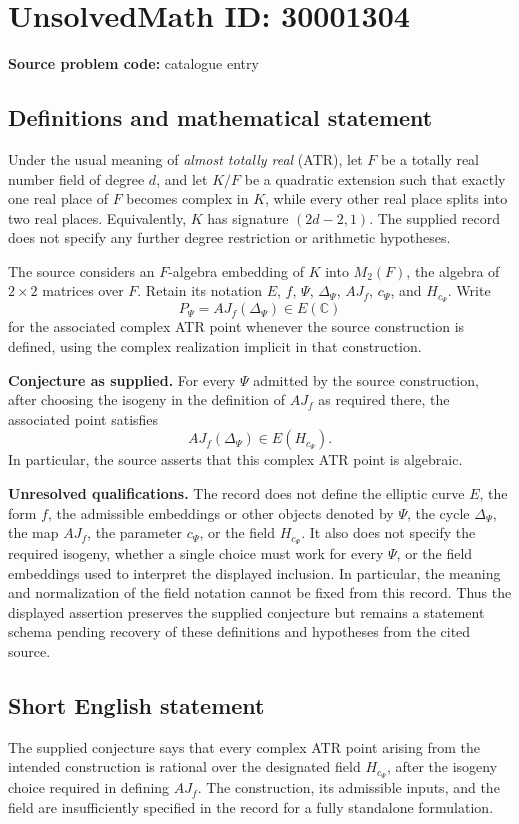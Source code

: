\documentclass[11pt]{article}
\newcommand{\C}{\mathbb{C}}
\begin{document}
\section*{UnsolvedMath ID: 30001304}
\textbf{Source problem code:} catalogue entry
\subsection{Definitions and mathematical statement}
Under the usual meaning of \emph{almost totally real} (ATR), let \(F\) be a totally real number field of degree \(d\), and let \(K/F\) be a quadratic extension such that exactly one real place of \(F\) becomes complex in \(K\), while every other real place splits into two real places. Equivalently, \(K\) has signature \((2d-2,1)\). The supplied record does not specify any further degree restriction or arithmetic hypotheses.

The source considers an \(F\)-algebra embedding of \(K\) into \(M_2(F)\), the algebra of \(2\times2\) matrices over \(F\). Retain its notation \(E\), \(f\), \(\Psi\), \(\Delta_\Psi\), \(AJ_f\), \(c_\Psi\), and \(H_{c_\Psi}\). Write
\[
P_\Psi=AJ_f(\Delta_\Psi)\in E(\C)
\]
for the associated complex ATR point whenever the source construction is defined, using the complex realization implicit in that construction.

\textbf{Conjecture as supplied.} For every \(\Psi\) admitted by the source construction, after choosing the isogeny in the definition of \(AJ_f\) as required there, the associated point satisfies
\[
AJ_f(\Delta_\Psi)\in E(H_{c_\Psi}).
\]
In particular, the source asserts that this complex ATR point is algebraic.

\textbf{Unresolved qualifications.} The record does not define the elliptic curve \(E\), the form \(f\), the admissible embeddings or other objects denoted by \(\Psi\), the cycle \(\Delta_\Psi\), the map \(AJ_f\), the parameter \(c_\Psi\), or the field \(H_{c_\Psi}\). It also does not specify the required isogeny, whether a single choice must work for every \(\Psi\), or the field embeddings used to interpret the displayed inclusion. In particular, the meaning and normalization of the field notation cannot be fixed from this record. Thus the displayed assertion preserves the supplied conjecture but remains a statement schema pending recovery of these definitions and hypotheses from the cited source.
\subsection{Short English statement}
The supplied conjecture says that every complex ATR point arising from the intended construction is rational over the designated field \(H_{c_\Psi}\), after the isogeny choice required in defining \(AJ_f\). The construction, its admissible inputs, and the field are insufficiently specified in the record for a fully standalone formulation.
\end{document}
